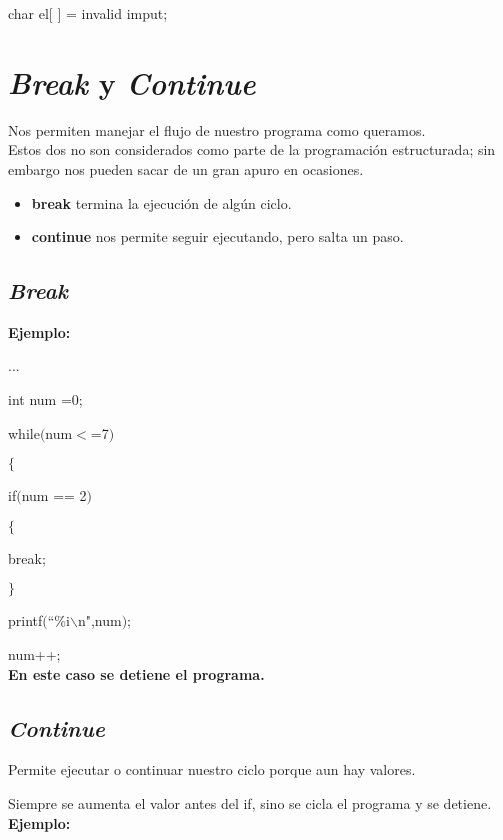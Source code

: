 \documentclass[]{article}
\begin{document}
	char el[ ] = invalid imput;
	
	
	\section{\textit{Break} y \textit{Continue}}
	
	Nos permiten manejar el flujo de nuestro programa como queramos.\\
	
	Estos dos no son considerados como parte de la programación estructurada; sin embargo nos pueden sacar de un gran apuro en ocasiones.
	
	\begin{itemize}
		\item \textbf{break} termina la ejecución de algún ciclo.
		\item \textbf{continue} nos permite seguir ejecutando, pero salta un paso.
	\end{itemize}

	
	\subsection{\textit{Break}}
	
	\textbf{Ejemplo:\\}
	
	...
	
	int num =0;	
	
	while$($num$<$=7$)$
	
	$\lbrace$
	
	if$($num == 2$)$
	
	$\lbrace$
	
	break;
	
	$\rbrace$
	
	printf$($``\%i$\backslash$n",num$)$;
	
	num++;\\
	
	\textbf{En este caso se detiene el programa.}
	
	\subsection{\textit{Continue}}
	Permite ejecutar o continuar nuestro ciclo porque aun hay valores.
	
	Siempre se aumenta el valor antes del if, sino se cicla el programa y se detiene.\\
	
	\textbf{Ejemplo:\\}
	
\end{document}
